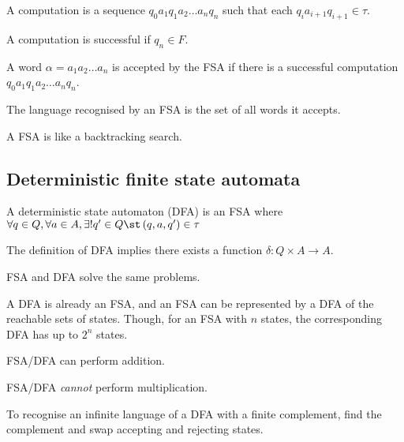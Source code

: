 \documentclass{article}
\begin{document}
\begin{definition}[Computation]
    A computation is a sequence \(q_0 a_1 q_1 a_2 \ldots a_n q_n\)
    such that each \(q_i a_{i+1} q_{i+1} \in \tau\).
\end{definition}
\begin{definition}[Successful]
    A computation is successful if \(q_n \in F\).
\end{definition}
\begin{definition}[Accepted]
    A word \(\alpha = a_1 a_2 \ldots a_n\)
    is accepted by the FSA if there is a
    successful computation \(q_0 a_1 q_1 a_2 \ldots a_n q_n\).
\end{definition}
\begin{definition}[Recognised]
    The language recognised by an FSA is
    the set of all words it accepts. 
\end{definition}
\begin{remark}
    A FSA is like a backtracking search.
\end{remark}
\subsection{Deterministic finite state automata}
\begin{definition}
    A deterministic state automaton (DFA) is an FSA where
    \(
        \forall q \in Q, \forall a \in A,
        \exists! q' \in Q \st \left(q,a,q'\right)\in\tau
    \)
\end{definition}
\begin{theorem}
    The definition of DFA implies there exists a function \(\delta: Q \times A \to A\).
\end{theorem}
\begin{theorem}
    FSA and DFA solve the same problems.
    
    A DFA is already an FSA,
    and an FSA can be represented by a DFA of the reachable sets of states.
    Though, for an FSA with \(n\) states,
    the corresponding DFA has up to \(2^n\) states.
\end{theorem}
\begin{theorem}
    FSA/DFA can perform addition.
\end{theorem}
\begin{theorem}
    FSA/DFA \emph{cannot} perform multiplication.
\end{theorem}
\begin{theorem}
    To recognise an infinite language of a DFA with a finite complement,
    find the complement and swap accepting and rejecting states.
\end{theorem}
\end{document}
